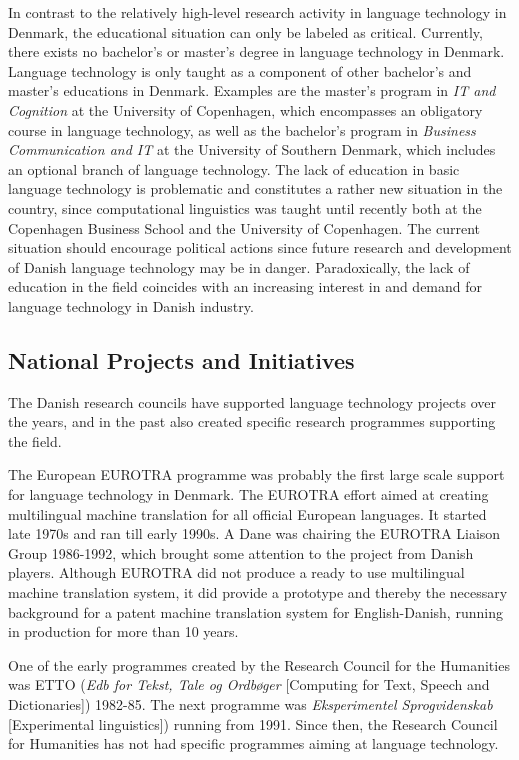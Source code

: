 \documentclass[]{../../metanetpaper}
\begin{document}
\begin{multicols}{2}
In contrast to the relatively high-level research activity in language technology in Denmark, the educational situation can only be labeled as critical. Currently, there exists no bachelor's or master's degree in language technology in Denmark. Language technology is only taught as a component of other bachelor's and master's educations in Denmark. Examples are the master's program in {\it IT and Cognition} at the University of Copenhagen, which encompasses an obligatory course in language technology, as well as the bachelor's program in {\it Business Communication and IT} at the University of Southern Denmark, which includes an optional branch of language technology. The lack of education in basic language technology is problematic and constitutes a rather new situation in the country, since computational linguistics was taught until recently both at the Copenhagen Business School and the University of Copenhagen. The current situation should encourage political actions since future research and development of Danish language technology may be in danger. Paradoxically, the lack of education in the field coincides with an increasing interest in and demand for language technology in Danish industry. 

\subsection{National Projects and Initiatives}

 The Danish research councils have supported language technology projects over the years, and in the past also created specific research programmes supporting the field.

The European EUROTRA programme was probably the first large scale support for language technology in Denmark. The EUROTRA effort aimed at creating multilingual machine translation for all official European languages. It started late 1970s and ran till early 1990s. A Dane was chairing the EUROTRA Liaison Group 1986-1992, which brought some attention to the project from Danish players. Although EUROTRA did not produce a ready to use multilingual machine translation system, it did provide a prototype and thereby the necessary background for a patent machine translation system for English-Danish, running in production for more than 10 years.

One of the early programmes created by the Research Council for the Humanities was ETTO ({\it Edb for Tekst, Tale og Ordb\o ger} [Computing for Text, Speech and Dictionaries]) 1982-85. The next programme was {\it Eksperimentel Sprogvidenskab} [Experimental linguistics]) running from 1991. Since then, the Research Council for Humanities has not had specific programmes aiming at language technology.


\end{multicols}
\end{document}
